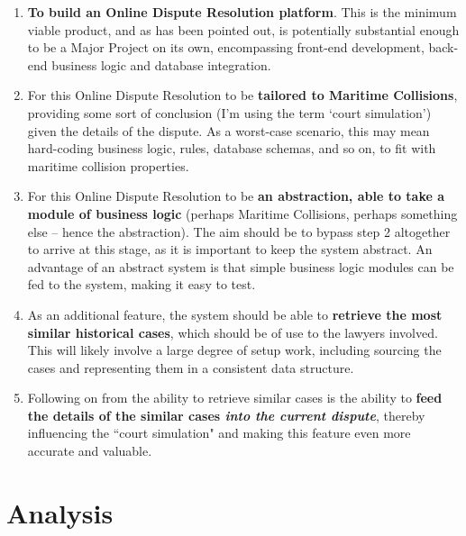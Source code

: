 \begin{enumerate}

    \item \textbf{To build an Online Dispute Resolution platform}. This is the minimum viable product, and as has been pointed out, is potentially substantial enough to be a Major Project on its own, encompassing front-end development, back-end business logic and database integration.
    
    \item For this Online Dispute Resolution to be \textbf{tailored to Maritime Collisions}, providing some sort of conclusion (I’m using the term `court simulation') given the details of the dispute. As a worst-case scenario, this may mean hard-coding business logic, rules, database schemas, and so on, to fit with maritime collision properties.

    \item For this Online Dispute Resolution to be \textbf{an abstraction, able to take a module of business logic} (perhaps Maritime Collisions, perhaps something else – hence the abstraction). The aim should be to bypass step 2 altogether to arrive at this stage, as it is important to keep the system abstract. An advantage of an abstract system is that simple business logic modules can be fed to the system, making it easy to test.

    \item As an additional feature, the system should be able to \textbf{retrieve the most similar historical cases}, which should be of use to the lawyers involved. This will likely involve a large degree of setup work, including sourcing the cases and representing them in a consistent data structure.

    \item Following on from the ability to retrieve similar cases is the ability to \textbf{feed the details of the similar cases \emph{into the current dispute}}, thereby influencing the ``court simulation" and making this feature even more accurate and valuable.

\end{enumerate}

\section{Analysis} %

